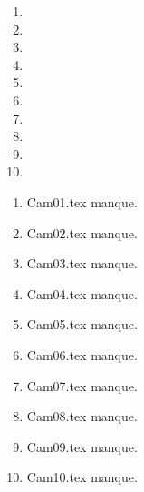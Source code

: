  
 
\begin{enumerate}
  \item  
  \item  
  \item  
  \item  
  \item  
  \item  
  \item  
  \item  
  \item  
  \item  
\end{enumerate} 
\clearpage 
{}
\begin{enumerate}
  \item Cam01.tex manque. 
  \item Cam02.tex manque. 
  \item Cam03.tex manque. 
  \item Cam04.tex manque. 
  \item Cam05.tex manque. 
  \item Cam06.tex manque. 
  \item Cam07.tex manque. 
  \item Cam08.tex manque. 
  \item Cam09.tex manque. 
  \item Cam10.tex manque. 
\end{enumerate} 
